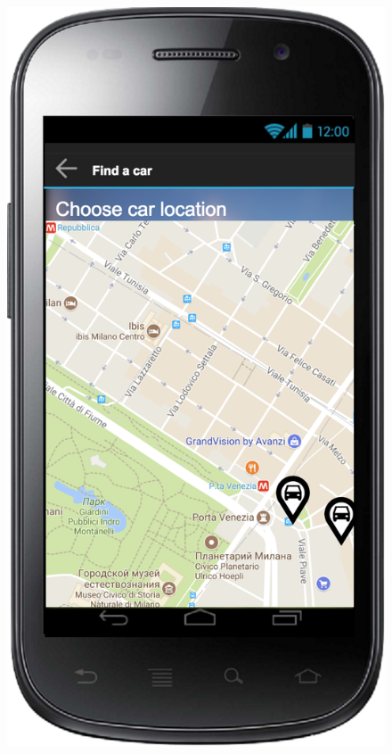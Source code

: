 \documentclass[a4paper,leqno]{article}
\begin{document}
\begin{figure}
	\begin{minipage}[!h]{0.45\linewidth}
		\centering
		\includegraphics[scale = 0.15]{findCar.png}
	\end{minipage}
\end{figure}
\end{document}

